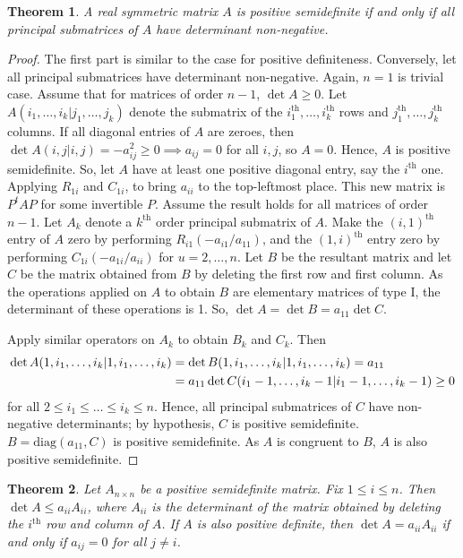 \documentclass[15pt,a4paper]{book}
\newtheorem{theorem}{Theorem}[chapter]
\theoremstyle{definition}
\begin{document}
\begin{theorem}
    A real symmetric matrix $A$ is positive semidefinite if and only if all principal submatrices of $A$ have determinant non-negative.
\end{theorem}
\begin{proof}
    The first part is similar to the case for positive definiteness. Conversely, let all principal submatrices have determinant non-negative. Again, $n=1$ is trivial case. Assume that for matrices of order $n-1$, $\det A \geq 0$. Let $A(i_{1},\ldots,i_{k}|j_{1},\ldots,j_{k})$ denote the submatrix of the $i_{1}^{\text{th}},\ldots,i_{k}^{\text{th}}$ rows and $j_{1}^{\text{th}},\ldots,j_{k}^{\text{th}}$ columns. If all diagonal entries of $A$ are zeroes, then $\det A(i,j|i,j) = -a_{ij}^{2} \geq 0 \implies a_{ij} = 0$ for all $i,j$, so $A = 0$. Hence, $A$ is positive semidefinite. So, let $A$ have at least one positive diagonal entry, say the $i^{\text{th}}$ one. Applying $R_{1i}$ and $C_{1i}$, to bring $a_{ii}$ to the top-leftmost place. This new matrix is $P^{t}AP$ for some invertible $P$. Assume the result holds for all matrices of order $n-1$. Let $A_{k}$ denote a $k^{\text{th}}$ order principal submatrix of $A$. Make the $(i,1)^{\text{th}}$ entry of $A$ zero by performing $R_{i1}(-a_{i1}/a_{11})$, and the $(1,i)^{\text{th}}$ entry zero by performing $C_{1i}(-a_{1i}/a_{ii})$ for $u = 2,\ldots,n$. Let $B$ be the resultant matrix and let $C$ be the matrix obtained from $B$ by deleting the first row and first column. As the operations applied on $A$ to obtain $B$ are elementary matrices of type I, the determinant of these operations is 1. So, $\det A = \det B = a_{11} \det C$.

    Apply similar operators on $A_{k}$ to obtain $B_{k}$ and $C_{k}$. Then
    \begin{align}
        \det A(1,i_{1},\ldots,i_{k}|1,i_{1},\ldots,i_{k}) &= \det B(1,i_{1},\ldots,i_{k}|1,i_{1},\ldots,i_{k}) = a_{11} \notag \\
        &= a_{11} \det C(i_{1}-1,\ldots,i_{k}-1|i_{1}-1,\ldots,i_{k}-1) \geq 0
    \end{align}
    for all $2 \leq i_{1} \leq \ldots \leq i_{k} \leq n$. Hence, all principal submatrices of $C$ have non-negative determinants; by hypothesis, $C$ is positive semidefinite. $B = \text{diag}(a_{11},C)$ is positive semidefinite. As $A$ is congruent to $B$, $A$ is also positive semidefinite.
\end{proof}

\begin{theorem}
    Let $A_{n \times n}$ be a positive semidefinite matrix. Fix $1 \leq i \leq n$. Then $\det A \leq a_{ii} A_{ii}$, where $A_{ii}$ is the determinant of the matrix obtained by deleting the $i^{\text{th}}$ row and column of $A$. If $A$ is also positive definite, then $\det A = a_{ii}A_{ii}$ if and only if $a_{ij} = 0$ for all $j \neq i$.
\end{theorem}
\end{document}
